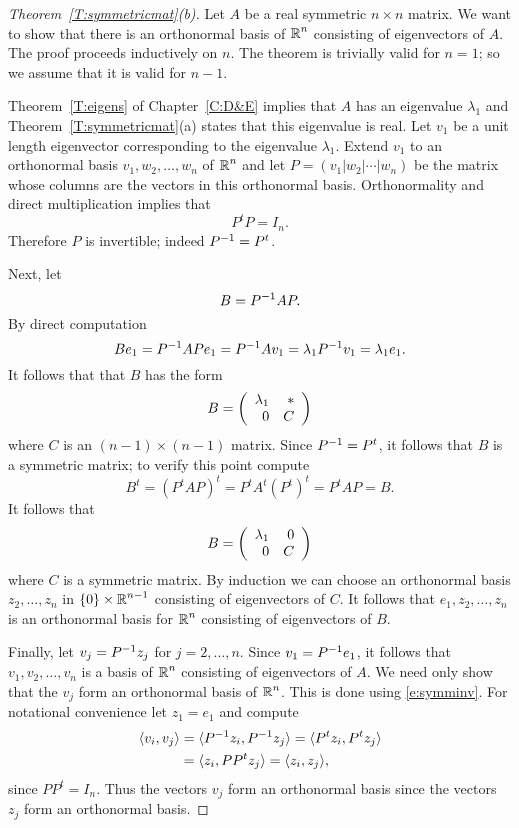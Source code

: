 \documentclass{ximera}
\begin{document}
\begin{proof}[Theorem~\ref{T:symmetricmat}(b)]
Let $A$ be a real symmetric $n\times n$ matrix.  We want to show that there
is an orthonormal basis of $\mbox{$\Bbb{R}$}^n$ consisting of eigenvectors of $A$.  The
proof proceeds inductively on $n$.   The theorem is trivially valid for
$n=1$; so we assume that it is valid for $n-1$.

Theorem~\ref{T:eigens} of Chapter~\ref{C:D&E} implies that $A$ has an 
eigenvalue $\lambda_1$ and Theorem~\ref{T:symmetricmat}(a) states that 
this eigenvalue is real.
Let $v_1$ be a unit length eigenvector corresponding to the eigenvalue
$\lambda_1$.  Extend $v_1$ to an orthonormal basis $v_1,w_2,\ldots,w_n$ of
$\mbox{$\Bbb{R}$}^n$ and let $P=(v_1|w_2|\cdots|w_n)$ be the matrix whose columns are the
vectors in this orthonormal basis.  Orthonormality and direct multiplication
implies that
\begin{equation}  \label{e:orthosym}
P^tP=I_n.
\end{equation}
Therefore $P$ is invertible; indeed $P^{-1}=P^t$.

Next, let
\[
B= P^{-1} AP.
\]
By direct computation
\[
Be_1 = P^{-1} APe_1 = P^{-1} Av_1 = \lambda_1 P^{-1} v_1=\lambda_1e_1.
\]
It follows that that $B$ has the form
\[
B = \left(\begin{array}{rr} \lambda_1 & *\\ 0 &C\end{array}\right)
\]
where $C$ is an $(n-1)\times (n-1)$ matrix.   Since $P^{-1}=P^t$, it follows
that $B$ is a symmetric matrix; to verify this point compute
\[
B^t = (P^t AP)^t = P^t A^t (P^t)^t = P^tAP = B.
\]
It follows that
\[
B =\left(\begin{array}{rr} \lambda_1 & 0\\ 0 &C\end{array}\right)
\]
where $C$ is a symmetric matrix.  By induction we can choose an orthonormal
basis $z_2,\ldots,z_n$ in $\{0\}\times\mbox{$\Bbb{R}$}^{n-1}$ consisting of eigenvectors
of $C$.  It follows that $e_1,z_2,\ldots,z_n$ is an orthonormal basis for
$\mbox{$\Bbb{R}$}^n$ consisting of eigenvectors of $B$.

Finally, let $v_j=P^{-1} z_j$ for $j=2,\ldots,n$.  Since $v_1=P^{-1} e_1$,
it follows that  $v_1,v_2,\ldots,v_n$ is a basis of $\mbox{$\Bbb{R}$}^n$ consisting of
eigenvectors of $A$.  We need only show that the $v_j$ form an orthonormal
basis of $\mbox{$\Bbb{R}$}^n$.   This is done using \eqref{e:symminv}.  For notational
convenience let $z_1=e_1$ and compute
\begin{align*}
\langle v_i,v_j \rangle  &=\langle P^{-1} z_i,P^{-1} z_j\rangle =
                           \langle P^tz_i, P^tz_j \rangle \\
  &= \langle z_i, PP^t z_j \rangle =
\langle z_i,z_j \rangle,
\end{align*}
since $PP^t= I_n$.  Thus the vectors $v_j$ form an orthonormal basis since
the vectors $z_j$ form an orthonormal basis.  \end{proof}
\end{document}
